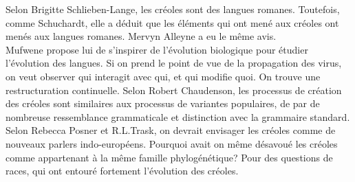 \documentclass{cours}
\begin{document}
Selon Brigitte Schlieben-Lange, les créoles sont des langues romanes. Toutefois, comme Schuchardt, elle a déduit que les éléments qui ont mené aux créoles ont menés aux langues romanes. Mervyn Alleyne a eu le même avis.\\
Mufwene propose lui de s'inspirer de l'évolution biologique pour étudier l'évolution des langues. Si on prend le point de vue de la propagation des virus, on veut observer qui interagit avec qui, et qui modifie quoi. 
On trouve une restructuration continuelle. Selon Robert Chaudenson, les processus de création des créoles sont similaires aux processus de variantes populaires, de par de nombreuse ressemblance grammaticale et distinction avec la grammaire standard.\\
Selon Rebecca Posner et R.L.Trask, on devrait envisager les créoles comme de nouveaux parlers indo-européens. Pourquoi avait on même désavoué les créoles comme appartenant à la même famille phylogénétique?
Pour des questions de races, qui ont entouré fortement l'évolution des créoles.\\
\end{document}
